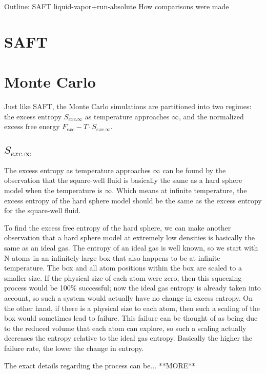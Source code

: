Outline:
SAFT\newline
liquid-vapor+run-absolute\newline
How comparisons were made\newline
\section{SAFT}
\section{Monte Carlo}
Just like SAFT, the Monte Carlo simulations are partitioned into two regimes: the excess entropy $S_{exc.\infty}$ as temperature approaches $\infty$, and the normalized excess free energy $F_{exc}-T\cdot S_{exc.\infty}$.
\subsection{$S_{exc.\infty}$}
The excess entropy as temperature approaches $\infty$ can be found by the observation that the square-well fluid is basically the same as a hard sphere model when the temperature is $\infty$. Which means at infinite temperature, the excess entropy of the hard sphere model should be the same as the excess entropy for the square-well fluid. 

To find the excess free entropy of the hard sphere, we can make another observation that a hard sphere model at extremely low densities is basically the same as an ideal gas. The entropy of an ideal gas is well known, so we start with N atoms in an infinitely large box that also happens to be at infinite temperature. The box and all atom positions within the box are scaled to a smaller size. If the physical size of each atom were zero, then this squeezing process would be 100\% successful; now the ideal gas entropy is already taken into account, so such a system would actually have no change in excess entropy. On the other hand, if there is a physical size to each atom, then such a scaling of the box would sometimes lead to failure. This failure can be thought of as being due to the reduced volume that each atom can explore, so such a scaling actually decreases the entropy relative to the ideal gas entropy. Basically the higher the failure rate, the lower the change in entropy.

The exact details regarding the process can be... **MORE**


